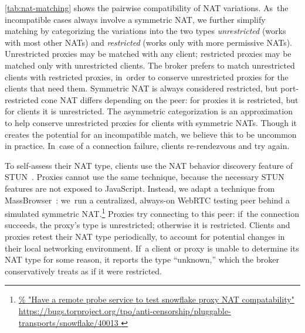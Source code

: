 \documentclass[letterpaper,twocolumn]{article}
\newcommand{\firstterm}[1]{\textit{#1}}
\newlength{\urlfootnotesize}
\newcommand{\urlfootnote}[1]{\footnote{
\raggedright\fontsize{\urlfootnotesize}{\urlfootnotesize}\selectfont\url{#1}
}}
\begin{document}
\autoref{tab:nat-matching}
shows the pairwise compatibility of NAT variations.
As~the incompatible cases always involve a symmetric NAT,
we further simplify matching by categorizing the variations into the two types
\firstterm{unrestricted} (works with most other NATs) and
\firstterm{restricted} (works only with more permissive NATs).
Unrestricted proxies may be matched with any client;
restricted proxies may be matched only with unrestricted clients.
The broker prefers to match unrestricted clients with restricted proxies,
in~order to conserve unrestricted proxies
for the clients that need them.
Symmetric NAT is always considered restricted,
but port-restricted cone NAT differs
depending on the peer:
for proxies it is restricted, but
for clients it is unrestricted.
The asymmetric categorization is an approximation
to help conserve unrestricted proxies
for clients with symmetric NATs.
Though it creates the potential for an incompatible match,
we believe this to be uncommon in practice.
In~case of a connection failure,
clients re-rendezvous and try again.

To self-assess their NAT type,
clients use the NAT behavior discovery feature of STUN~\cite{rfc5780}.
Proxies cannot use the same technique,
because the necessary STUN features are not exposed
to JavaScript.
Instead,
we adapt a technique from MassBrowser~\cite[\S \mbox{V-A}]{Nasr2020a}:
we~run a centralized, always-on WebRTC testing peer
behind a simulated symmetric NAT.\urlfootnote{
https://bugs.torproject.org/tpo/anti-censorship/pluggable-transports/snowflake/40013
}
Proxies try connecting to this peer:
if~the connection succeeds, the proxy's type is unrestricted;
otherwise it is restricted.
Clients and proxies retest their NAT type periodically,
to account for potential changes in their local networking environment.
If~a client or proxy is unable to determine its NAT type for some reason,
it reports the type ``unknown,''
which the broker conservatively treats as if it were restricted.
\end{document}
